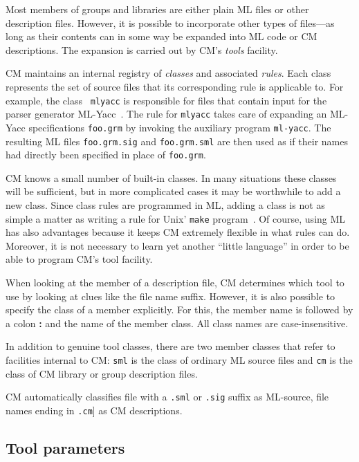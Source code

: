 \documentclass{article}
\begin{document}
Most members of groups and libraries are either plain ML files or
other description files.  However, it is possible to incorporate other
types of files---as long as their contents can in some way be expanded
into ML code or CM descriptions.  The expansion is carried out by CM's
{\it tools} facility.

CM maintains an internal registry of {\em classes} and associated {\em
rules}.  Each class represents the set of source files that its
corresponding rule is applicable to.  For example, the class {\tt
mlyacc} is responsible for files that contain input for the parser
generator ML-Yacc~\cite{tarditi90:yacc}.  The rule for {\tt mlyacc}
takes care of expanding an ML-Yacc specifications {\tt foo.grm} by
invoking the auxiliary program {\tt ml-yacc}.  The resulting ML files
{\tt foo.grm.sig} and {\tt foo.grm.sml} are then used as if their
names had directly been specified in place of {\tt foo.grm}.

CM knows a small number of built-in classes.  In many situations these
classes will be sufficient, but in more complicated cases it may be
worthwhile to add a new class.  Since class rules are programmed in
ML, adding a class is not as simple a matter as writing a rule for
{\sc Unix}' {\tt make} program~\cite{feldman79}.  Of course,
using ML has also advantages because it keeps CM extremely flexible in
what rules can do.  Moreover, it is not necessary to learn yet another
``little language'' in order to be able to program CM's tool facility.

When looking at the member of a description file, CM determines which
tool to use by looking at clues like the file name suffix.  However,
it is also possible to specify the class of a member explicitly.  For
this, the member name is followed by a colon {\bf :} and the name of
the member class.  All class names are case-insensitive.

In addition to genuine tool classes, there are two member classes
that refer to facilities internal to CM: {\tt sml} is the class of
ordinary ML source files and {\tt cm} is the class of CM library or
group description files.

CM automatically classifies file with a {\tt .sml} or {\tt .sig}
suffix as ML-source, file names ending in {\tt .cm}] as CM
descriptions.

\subsection{Tool parameters}
\end{document}
